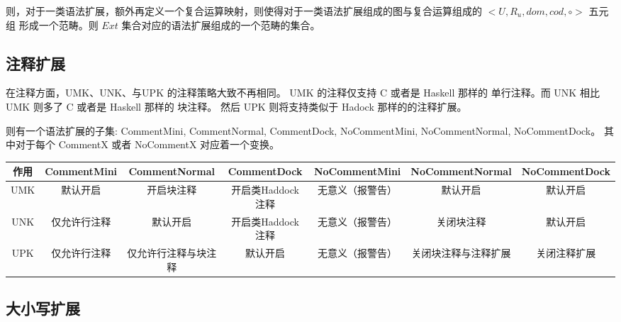 \documentclass{ctexart}
\begin{document}
则，对于一类语法扩展，额外再定义一个复合运算映射，则使得对于一类语法扩展组成的图与复合运算组成的 $<U,R_u,dom,cod,\circ>$ 五元组
形成一个范畴。则 $Ext$ 集合对应的语法扩展组成的一个范畴的集合。


\subsection{注释扩展}
\label{sec:langexte:comment}

在注释方面，UMK、UNK、与UPK 的注释策略大致不再相同。 UMK 的注释仅支持 C 或者是 Haskell 那样的 单行注释。而 UNK 相比UMK 则多了
C 或者是 Haskell 那样的 块注释。 然后 UPK 则将支持类似于 Hadock 那样的的注释扩展。

则有一个语法扩展的子集: CommentMini, CommentNormal, CommentDock, NoCommentMini, NoCommentNormal, NoCommentDock。
其中对于每个 CommentX 或者 NoCommentX 对应着一个变换。

\begin{tabular}{|c|c|c|c|c|c|c|}
  \hline 作用 & CommentMini & CommentNormal & CommentDock & NoCommentMini & NoCommentNormal & NoCommentDock \\
  \hline UMK & 默认开启 & 开启块注释 & 开启类Haddock注释 & 无意义（报警告）& 默认开启 & 默认开启 \\ 
  \hline UNK & 仅允许行注释 & 默认开启 & 开启类Haddock注释 & 无意义（报警告） & 关闭块注释 & 默认开启 \\
  \hline UPK & 仅允许行注释 & 仅允许行注释与块注释 & 默认开启 & 无意义（报警告） & 关闭块注释与注释扩展 & 关闭注释扩展 \\
  \hline 
\end{tabular}

\subsection{大小写扩展}
\label{sec:langexte:lettercase}
\end{document}
